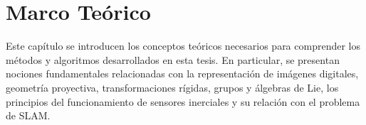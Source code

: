 
\chapter{Marco Teórico}
\label{marco_teorico}

Este capítulo se introducen los conceptos teóricos necesarios para comprender
los métodos y algoritmos desarrollados en esta tesis. En particular,
se presentan nociones fundamentales relacionadas con la representación
de imágenes digitales, geometría proyectiva, transformaciones rígidas,
grupos y álgebras de Lie, los principios del funcionamiento de sensores inerciales y su relación con el problema de SLAM.




























%

%

%

%

